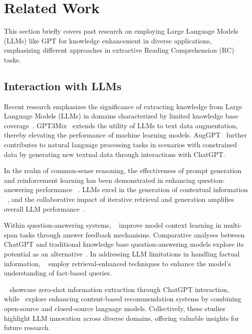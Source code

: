 \section{Related Work}
\label{sec:related}
This section briefly covers past research on employing Large Language Models (LLMs) like GPT for knowledge enhancement in diverse applications, emphasizing different approaches in extractive Reading Comprehension (RC) tasks.

\subsection{Interaction with LLMs}
Recent research emphasizes the significance of extracting knowledge from Large Language Models (LLMs) in domains characterized by limited knowledge base coverage~\citep{fang2021leveraging}.
GPT3Mix~\citep{yoo2021gpt3mix} extends the utility of LLMs to text data augmentation, thereby elevating the performance of machine learning models. 
AugGPT~\citep{dai2023auggpt} further contributes to natural language processing tasks in scenarios with constrained data by generating new textual data through interactions with ChatGPT.

In the realm of common-sense reasoning, the effectiveness of prompt generation and reinforcement learning has been demonstrated in enhancing question-answering performance ~\citep{liu2021generated,liu2022rainier}. 
LLMs excel in the generation of contextual information ~\citep{yu2022generate}, 
and the collaborative impact of iterative retrieval and generation amplifies overall LLM performance~\citep{shao2023enhancing}.

Within question-answering systems, ~\citep{huang2023enhancing} improve model context learning in multi-span tasks through answer feedback mechanisms. 
Comparative analyses between ChatGPT and traditional knowledge base question-answering models explore its potential as an alternative~\citep{tan2023can}. 
In addressing LLM limitations in handling factual information, ~\citep{ren2023investigating} employ retrieval-enhanced techniques to enhance the model's understanding of fact-based queries.

~\citep{wei2023zero} showcase zero-shot information extraction through ChatGPT interaction, 
while~\citep{wei2023zero} explore enhancing content-based recommendation systems by combining open-source and closed-source language models. 
Collectively, these studies highlight LLM innovation across diverse domains, offering valuable insights for future research.

